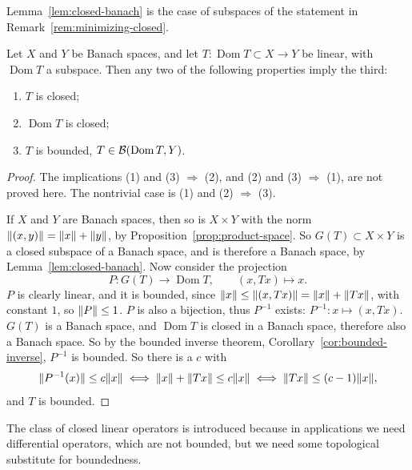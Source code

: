 \begin{remark}
Lemma~\ref{lem:closed-banach} is the case of subspaces of the statement in
Remark~\ref{rem:minimizing-closed}.
\end{remark}

\begin{theorem}\label{thm:closed-graph}
Let $X$ and $Y$ be Banach spaces, and let
$T \colon \operatorname{Dom} T \subset X \to Y$ be linear, with
$\operatorname{Dom} T$ a subspace. Then any two of the following properties
imply the third:
\begin{enumerate}
  \item $T$ is closed;
  \item $\operatorname{Dom} T$ is closed;
  \item $T$ is bounded, $T \in \mathcal{B}(\operatorname{Dom} T, Y)$.
\end{enumerate}
\end{theorem}

\begin{proof}
The implications (1) and (3) $\Rightarrow$ (2), and (2) and (3)
$\Rightarrow$ (1), are not proved here. The nontrivial case is (1) and (2)
$\Rightarrow$ (3).

If $X$ and $Y$ are Banach spaces, then so is $X \times Y$ with the norm
$\lVert(x,y)\rVert = \lVert x\rVert + \lVert y\rVert$, by
Proposition~\ref{prop:product-space}. So $G(T) \subset X \times Y$ is a
closed subspace of a Banach space, and is therefore a Banach space, by
Lemma~\ref{lem:closed-banach}. Now consider the projection
\[
  P \colon G(T) \to \operatorname{Dom} T, \qquad (x, Tx) \mapsto x .
\]
$P$ is clearly linear, and it is bounded, since
$\lVert x\rVert \le \lVert(x, Tx)\rVert = \lVert x\rVert + \lVert Tx\rVert$, with constant $1$, so
$\lVert P\rVert \le 1$. $P$ is also a bijection, thus $P^{-1}$ exists:
$P^{-1} \colon x \mapsto (x, Tx)$. $G(T)$ is a Banach space, and
$\operatorname{Dom} T$ is closed in a Banach space, therefore also a Banach
space. So by the bounded inverse theorem,
Corollary~\ref{cor:bounded-inverse}, $P^{-1}$ is bounded. So there is a $c$
with
\[
  \lVert P^{-1}(x)\rVert \le c\lVert x\rVert
  \iff \lVert x\rVert + \lVert Tx\rVert \le c\lVert x\rVert
  \iff \lVert Tx\rVert \le (c - 1)\lVert x\rVert ,
\]
and $T$ is bounded.
\end{proof}

\begin{remark}
The class of closed linear operators is introduced because in applications
we need differential operators, which are not bounded, but we need some
topological substitute for boundedness.
\end{remark}

